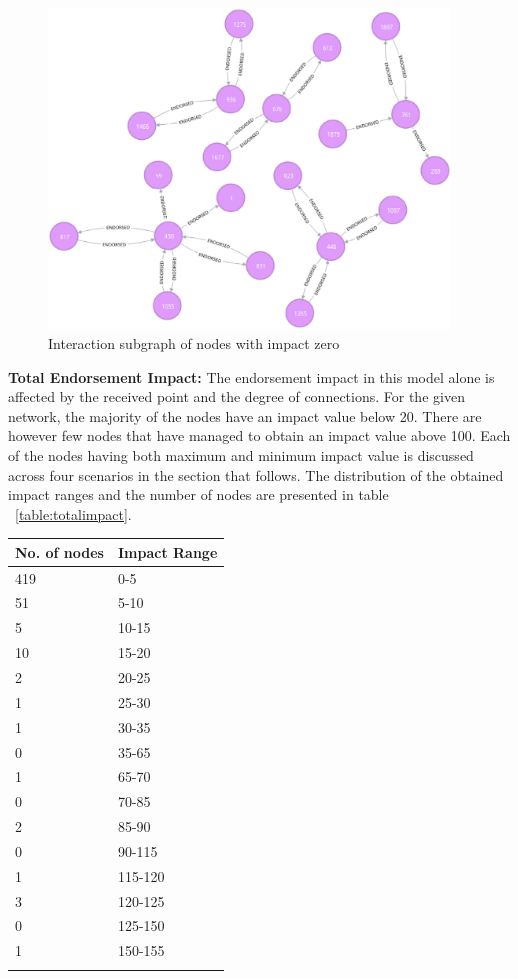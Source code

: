 \begin{figure}[h]
	\includegraphics[width=0.95\textwidth]{Images/nodesWithImpactZero.eps}
	\caption{Interaction subgraph of nodes with impact zero}
	\label{fig:zeroimpact}
\end{figure}
\textbf{Total Endorsement Impact:} The endorsement impact in this model alone
is affected by the received point and the degree of connections. For the given
network, the majority of the nodes have an impact value below 20. There are
however few nodes that have managed to obtain an impact value above 100. Each
of the nodes having both maximum and minimum impact value is discussed across
four scenarios in the section that follows.  The distribution of the obtained
impact ranges and the number of nodes are presented in table
~\ref{table:totalimpact}.

\begin{tabularx}{\textwidth}{| X | X | }
  \hline
   \textbf{No. of nodes} & \textbf{Impact Range} \\
  \hline 
  419  & 0-5  \\
  \hline
   51 & 5-10 \\
  \hline
  5 & 10-15 \\
  \hline
  10 & 15-20 \\
  \hline
  2 & 20-25 \\
  \hline
  1 & 25-30 \\
  \hline
  1 & 30-35 \\
  \hline
  0 & 35-65 \\
  \hline
  1 & 65-70 \\
  \hline
  0 & 70-85 \\
  \hline
  2 & 85-90 \\
  \hline
  0 & 90-115 \\
  \hline
  1 & 115-120 \\
  \hline
  3 & 120-125 \\
  \hline
  0 & 125-150 \\
  \hline
  1 & 150-155 \\
  \hline
  \caption{No. of nodes and the corresponding impact ranges}
  \label{table:totalimpact}
\end{tabularx}

